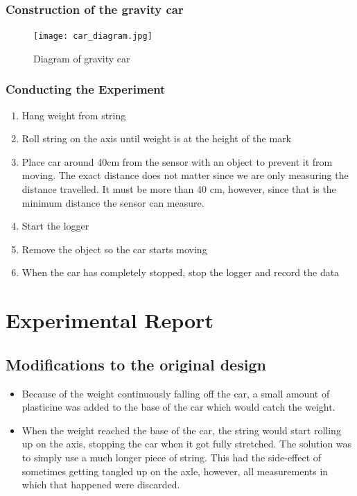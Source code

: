 \documentclass[titlepage,12pt]{article}
\begin{document}
        \subsubsection{Construction of the gravity car}
        \begin{figure}[H]
            \centering
            \label{fig:car_diagram}
            \caption{Diagram of gravity car}
            \texttt{[image: car\_diagram.jpg]}
        \end{figure}
            
        \subsubsection{Conducting the Experiment}
            \begin{enumerate}
                \item Hang weight from string
                \item Roll string on the axis until weight is at the height of the
                    mark
                \item Place car around 40cm from the sensor with an object to
                    prevent it from moving. The exact distance does not matter since
                    we are only measuring the distance travelled. It must be more
                    than 40 cm, however, since that is the minimum distance the
                    sensor can measure.  
                \item Start the logger
                \item Remove the object so the car starts moving
                \item When the car has completely stopped, stop the logger and
                    record the data
            \end{enumerate}

\section{Experimental Report}
    \subsection{Modifications to the original design}
    \begin{itemize}
        \item Because of the weight continuously falling off the car, a small
            amount of plasticine was added to the base of the car which would
            catch the weight.

        \item When the weight reached the base of the car, the string would
            start rolling up on the axis, stopping the car when it got fully
            stretched. The solution was to simply use a much longer piece of
            string. This had the side-effect of sometimes getting tangled up on
            the axle, however, all measurements in which that happened were
            discarded.
    \end{itemize}
\end{document}
